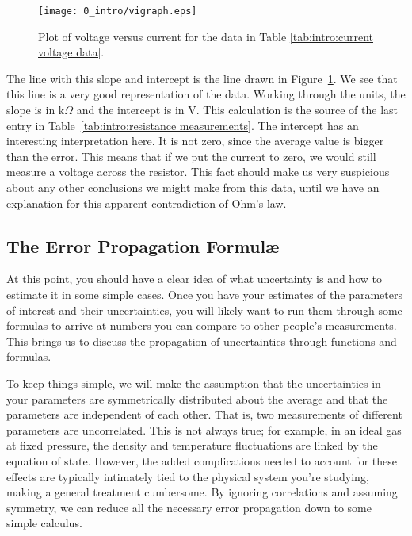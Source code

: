 \begin{figure}[!htb]
\centering
\epsfxsize=12cm \texttt{[image: 0\_intro/vigraph.eps]}
\caption{Plot of voltage versus current for the data in Table \ref{tab:intro:current voltage data}.}
\label{fig:intro:current voltage plot}
\end{figure}

\noindent The line with this slope and intercept is the line drawn in 
Figure~\ref{fig:intro:current voltage plot}. We see that this line is a very 
good representation of the data. Working through the units,  the slope is in 
k$\Omega$ and the intercept is in V. This calculation is the source of the last
entry in Table~\ref{tab:intro:resistance measurements}. The intercept has an 
interesting interpretation here. It is not zero, since the average value is 
bigger than the error. This means that if we put the current to zero, we would 
still measure a voltage across the resistor. This fact should make us very 
suspicious about any other conclusions we might make from this data, until we 
have an explanation for this apparent contradiction of Ohm's law.

\subsection{The Error Propagation Formul\ae}
\label{sec:intro:reprtun}
At this point, you should have a clear idea of what uncertainty is and how to 
estimate it in some simple cases. Once you have your estimates of the
parameters of interest and their uncertainties, you will likely want to run
them through some formulas to arrive at numbers you can compare to other
people's measurements. This brings us to discuss the propagation of
uncertainties through functions and formulas.

To keep things simple, we will make the assumption that the uncertainties in
your parameters are symmetrically distributed about the average and that the
parameters are independent of each other. That is, two measurements of
different parameters are uncorrelated. This is not always true; for example,
in an ideal gas at fixed pressure, the density and temperature fluctuations
are linked by the equation of state. However, the added complications needed
to account for these effects are typically intimately tied to the physical
system you're studying, making a general treatment cumbersome. By ignoring
correlations and assuming symmetry, we can reduce all the necessary error
propagation down to some simple calculus.

